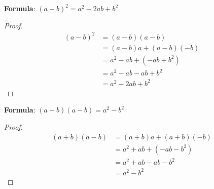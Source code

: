 \documentclass[12pt]{article}
\begin{document}
\noindent \textbf{Formula}: $(a-b)^2=a^2-2ab+b^2$
\begin{proof}
\begin{align*}
(a-b)^2&=(a-b)(a-b) \\
&=(a-b)a+(a-b)(-b) \\
&=a^2-ab+(-ab+b^2) \\
&=a^2-ab-ab+b^2 \\
&=a^2-2ab+b^2
\end{align*}
\end{proof}
\noindent \textbf{Formula}: $(a+b)(a-b)=a^2-b^2$
\begin{proof}
\begin{align*}
(a+b)(a-b)&=(a+b)a+(a+b)(-b) \\
&=a^2+ab+(-ab-b^2) \\
&=a^2+ab-ab-b^2 \\
&=a^2-b^2
\end{align*}
\end{proof}
\end{document}

